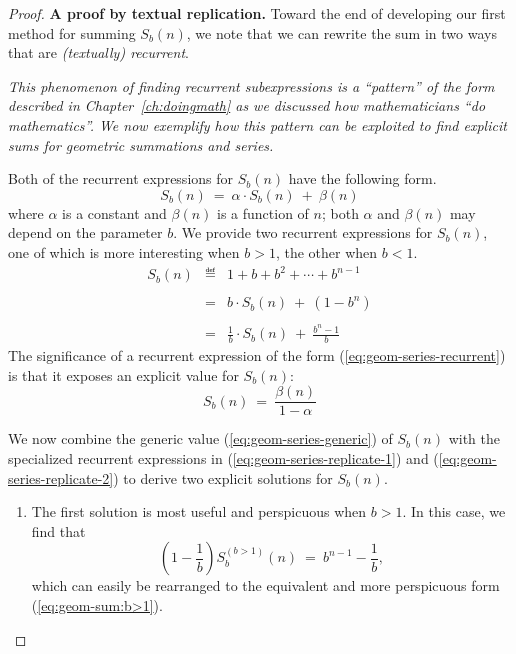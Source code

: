 \begin{proof}
{\bf A proof by textual replication.}
%
Toward the end of developing our first method for summing $S_{b}(n)$,
we note that we can rewrite the sum in two ways that are {\em
  (textually) recurrent}.

\bigskip

\noindent
{\em This phenomenon of {\em finding recurrent subexpressions} is a
  ``pattern'' of the form described in Chapter~\ref{ch:doingmath} as
  we discussed how mathematicians ``do mathematics''.  We now
  exemplify how this pattern can be exploited to find explicit sums
  for geometric summations and series.}

\bigskip

\noindent
Both of the recurrent expressions for $S_{b}(n)$ have the following form.
\begin{equation}
\label{eq:geom-series-recurrent}
S_b(n) \ = \ \alpha \cdot S_b(n) \ + \ \beta(n)
\end{equation}
where $\alpha$ is a constant and $\beta(n)$ is a function of $n$; both
$\alpha$ and $\beta(n)$ may depend on the parameter $b$.  We provide
two recurrent expressions for $S_b(n)$, one of which is more
interesting when $b>1$, the other when $b<1$.
\begin{eqnarray}
\label{eq:geom-series-replicate}
\nonumber
S_{b}(n) 
  & \eqdef &
1+ b + b^2 + \cdots + b^{n-1}  \\
\nonumber
  &   &  \\
\label{eq:geom-series-replicate-1}
   & = & b \cdot S_{b}(n) \ + \ (1 - b^n) \\
\nonumber
   &  & \\
\label{eq:geom-series-replicate-2}
  & = &
\frac{1}{b} \cdot S_{b}(n) \ + \ \frac{b^n -1}{b} 
\end{eqnarray}
The significance of a recurrent expression of the form
(\ref{eq:geom-series-recurrent}) is that it exposes an explicit value
for $S_b(n)$:
\begin{equation}
\label{eq:geom-series-generic}
S_b(n) \ = \ \frac{\beta(n)}{1 - \alpha}
\end{equation}

We now combine the generic value (\ref{eq:geom-series-generic}) of
$S_b(n)$ with the specialized recurrent expressions in
(\ref{eq:geom-series-replicate-1}) and
(\ref{eq:geom-series-replicate-2}) to derive two explicit solutions
for $S_b(n)$.
\begin{enumerate}
\item
The first solution is most useful and perspicuous when $b>1$.  In this
case, we find that
\[ \left( 1 - \frac{1}{b} \right)  S^{(b>1)}_{b}(n) \ = \ b^{n-1} -
\frac{1}{b}, \]
which can easily be rearranged to the equivalent and more
perspicuous form (\ref{eq:geom-sum:b>1}).


\end{enumerate}
\end{proof}
